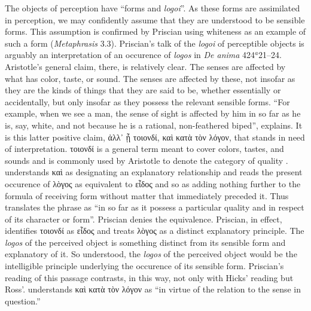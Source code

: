 \documentclass[12pt]{article}
\begin{document}
The objects of perception have ``forms and \emph{logoi}''. As these forms are assimilated in perception, we may confidently assume that they are understood to be sensible forms. This assumption is confirmed by Priscian using whiteness as an example of such a form (\emph{Metaphrasis} 3.3). Priscian's talk of the \emph{logoi} of perceptible objects is arguably an interpretation of an occurence of \emph{logos} in \emph{De anima} 424\( ^{a} \)21--24. Aristotle's general claim, there, is relatively clear. The senses are affected by what has color, taste, or sound. The senses are affected by these, not insofar as they are the kinds of things that they are said to be, whether essentially or accidentally, but only insofar as they possess the relevant sensible forms. ``For example, when we see a man, the sense of sight is affected by him in so far as he is, say, white, and not because he is a rational, non-feathered biped'', \citet[113]{Hamlyn:2002ys} explains. It is this latter positive claim, {\sbl ἀλλ᾽ ᾗ τοιονδί, καὶ κατὰ τὸν λόγον}, that stands in need of interpretation. {\sbl τοιονδί} is a general term meant to cover colors, tastes, and sounds and is commonly used by Aristotle to denote the category of quality \citep[416]{Hicks:1907uq}. \citet[417]{Hicks:1907uq} understands {\sbl καὶ} as designating an explanatory relationship and reads the present occurence of {\sbl λὸγος} as equivalent to {\sbl εἶδος} and so as adding nothing further to the formula of receiving form without matter that immediately preceded it. Thus \citet[105]{Hicks:1907uq} translates the phrase as ``in so far as it possess a particular quality and in respect of its character or form''. Priscian denies the equivalence. Priscian, in effect, identifies {\sbl τοιονδί} as {\sbl εἶδος} and treats {\sbl λὸγος} as a distinct explanatory principle. The \emph{logos} of the perceived object is something distinct from its sensible form and explanatory of it. So understood, the \emph{logos} of the perceived object would be the intelligible principle underlying the occurence of its sensible form. Priscian's reading of this passage contrasts, in this way, not only with Hicks' reading but Ross'. \citet[264]{Ross:1961uq} understands {\sbl καὶ κατὰ τὸν λόγον} as ``in virtue of the relation to the sense in question.''

\end{document}

